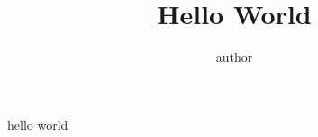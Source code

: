 \documentclass[10pt,a4paper]{article}
\title{Hello World}
\author{author}
\begin{document}
hello world
\end{document}
